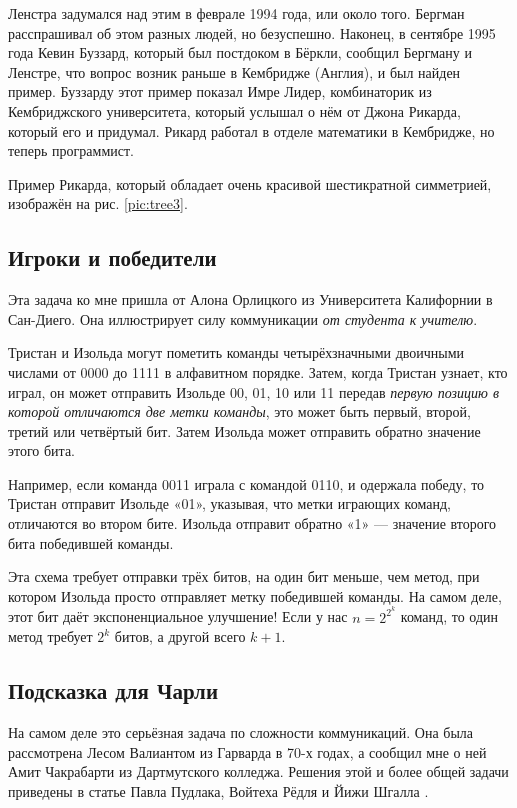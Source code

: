 Ленстра задумался над этим в феврале 1994 года, или около того.
Бергман расспрашивал об этом разных людей, но безуспешно.
Наконец, в сентябре 1995 года Кевин Буззард, который был постдоком в Бёркли, сообщил Бергману и Ленстре, что вопрос возник раньше в Кембридже (Англия), и был найден пример.
Буззарду этот пример показал Имре Лидер, комбинаторик из Кембриджского университета, который услышал о нём от Джона Рикарда, который его и придумал.
Рикард работал в отделе математики в Кембридже, но теперь программист.

Пример Рикарда, который обладает очень красивой шестикратной симметрией, изображён на рис. \ref{pic:tree3}.

\subsection*{Игроки и победители}

Эта задача ко мне пришла от Алона Орлицкого из Университета Калифорнии в Сан-Диего.
Она иллюстрирует силу коммуникации \emph{от студента к учителю}.

Тристан и Изольда могут пометить команды четырёхзначными двоичными числами от 0000 до 1111 в алфавитном порядке. Затем, когда Тристан узнает, кто играл, он может отправить Изольде 00, 01, 10 или 11 передав \emph{первую позицию в которой отличаются две метки команды}, это может быть первый, второй, третий или четвёртый бит.
Затем Изольда может отправить обратно значение этого бита.

Например, если команда 0011 играла с командой 0110, и одержала победу,
то Тристан отправит Изольде «01», указывая, что метки играющих команд, отличаются во втором бите.
Изольда отправит обратно «1» --- значение второго бита победившей команды.

Эта схема требует отправки трёх битов, на один бит меньше, чем метод, при котором Изольда просто отправляет метку победившей команды.
На самом деле, этот бит даёт экспоненциальное улучшение!
Если у нас $n = 2^{2^k}$ команд, то один метод требует $2^k$ битов, а другой всего $k + 1$.



\subsection*{Подсказка для Чарли}

На самом деле это серьёзная задача по сложности коммуникаций.
Она была рассмотрена Лесом Валиантом из Гарварда в 70-х годах,
а сообщил мне о ней Амит Чакрабарти из Дартмутского колледжа.
Решения этой и более общей задачи приведены в статье Павла Пудлака, Войтеха Рёдля и Йижи Шгалла \cite{49}.


